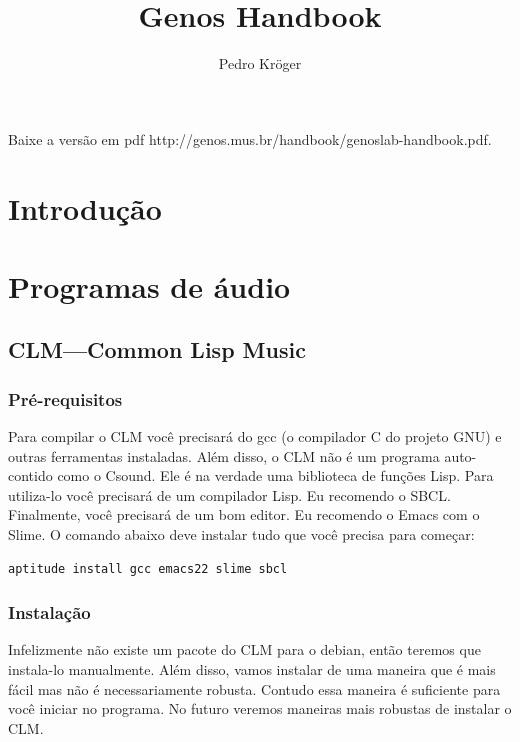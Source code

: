 \documentclass[brazil]{book}
\title{Genos Handbook}
\author{Pedro Kröger}
\begin{document}
\graphicspath{{figs/}}

\maketitle

\begin{htmlonly}
  Baixe a versão em pdf 
  {http://genos.mus.br/handbook/genoslab-handbook.pdf}.
\end{htmlonly}

\tableofcontents

\part{Introdução}
\label{part:introducao}

\part{Programas de áudio}
\label{part:programas-de-audio}

\chapter{CLM---Common Lisp Music}
\label{cha:clm-common-lisp}

\section{Pré-requisitos}
\label{sec:pre-requisitos}

Para compilar o CLM você precisará do gcc (o compilador C do projeto
GNU) e outras ferramentas instaladas. Além disso, o CLM não é um
programa auto-contido como o Csound. Ele é na verdade uma biblioteca
de funções Lisp. Para utiliza-lo você precisará de um compilador Lisp.
Eu recomendo o SBCL. Finalmente, você precisará de um bom editor. Eu
recomendo o Emacs com o Slime. O comando abaixo deve instalar tudo que
você precisa para começar:

\begin{verbatim}
aptitude install gcc emacs22 slime sbcl
\end{verbatim}

\section{Instalação}
\label{sec:instalacao}

Infelizmente não existe um pacote do CLM para o debian, então teremos
que instala-lo manualmente. Além disso, vamos instalar de uma maneira
que é mais fácil mas não é necessariamente robusta. Contudo essa
maneira é suficiente para você iniciar no programa. No futuro veremos
maneiras mais robustas de instalar o CLM.
\end{document}
